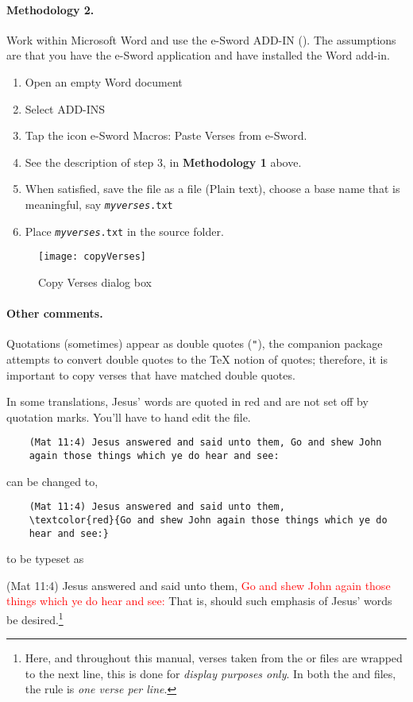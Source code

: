 \documentclass{article}
\makeatletter
\renewenvironment{quote}[1][]
   {\def\@rgi{#1}\ifx\@rgi\@empty
    \let\rghtm\@empty\else\def\rghtm{\rightmargin\leftmargin}\fi
    \list{}{\rghtm} %
    \item\relax}
   {\endlist}
\makeatother
\begin{document}
    \paragraph*{Methodology 2.} Work within \textsf{Microsoft Word} and use the
    \textsf{e-Sword} ADD-IN (). The
    assumptions are that you have the \textsf{e-Sword} application and have installed
    the \textsf{Word} add-in.
    \begin{enumerate}
    \item Open an empty Word document
    \item Select ADD-INS
    \item Tap the icon e-Sword Macros: Paste Verses from e-Sword.
    \item See the description of step 3, in \textbf{Methodology 1} above.
    \item When satisfied, save the file as a  file (Plain text), choose a
        base name that is meaningful, say \texttt{{\slshape{myverses}}.txt}
    \item Place \texttt{{\slshape{myverses}}.txt} in the source folder.
    \end{enumerate}

\begin{figure}[htb]\centering
  \texttt{[image: copyVerses]}
  \caption{\textsf{Copy Verses} dialog box}\label{fig:cpyVrs}
\end{figure}

    \paragraph*{Other comments.} Quotations (sometimes) appear as double quotes
    (\texttt{"}), the companion package  attempts to convert
    double quotes to the {\TeX} notion of quotes; therefore, it is important
    to copy verses that have matched double quotes.

    In some translations, Jesus' words are quoted in red and are not set off
    by quotation marks. You'll have to hand edit the  file.
\begin{Verbatim}
    (Mat 11:4) Jesus answered and said unto them, Go and shew John
    again those things which ye do hear and see:
\end{Verbatim}
    can be changed to,
\begin{Verbatim}
    (Mat 11:4) Jesus answered and said unto them,
    \textcolor{red}{Go and shew John again those things which ye do
    hear and see:}
\end{Verbatim}
to be typeset as
    \begin{quote}
    (Mat 11:4) Jesus answered and said unto them, \textcolor{red}{Go and shew John
    again those things which ye do hear and see:}
    \end{quote}
    That is, should such emphasis of Jesus' words be desired.\footnote{Here,
    and throughout this manual, verses taken from the  or 
    files are wrapped to the next line, this is done for \emph{display
    purposes only}. In both the  and  files, the rule is
    \emph{one verse per line}.}
\end{document}
